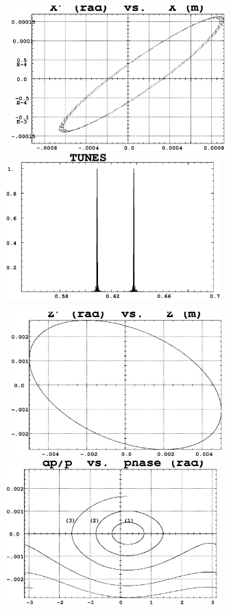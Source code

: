 \begin{figure}[H]
\begin{center}


\vspace{-5mm}

\mbox{
\includegraphics[height=5.6cm]{FigC6-2a.ps}
\includegraphics[height=5.6cm]{FigC6-2b.ps} 
}

\vspace{-5mm}
\mbox{
\includegraphics[height=5.6cm]{FigC6-2c.ps}
\includegraphics[height=5.6cm]{FigC6-2d.ps}
}


\end{center}
\end{figure}
